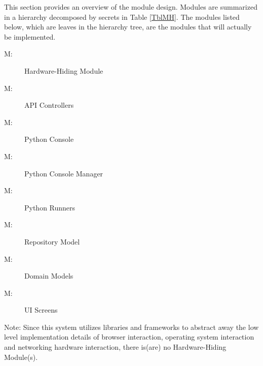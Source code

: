 \documentclass[12pt, titlepage]{article}
\newcounter{mnum}
\newcommand{\mthemnum}{M\themnum}
\begin{document}
This section provides an overview of the module design. Modules are summarized
in a hierarchy decomposed by secrets in Table \ref{TblMH}. The modules listed
below, which are leaves in the hierarchy tree, are the modules that will
actually be implemented.

\begin{description}
\item [ \mthemnum \label{mHH}:] Hardware-Hiding Module
\item [ \mthemnum \label{mHH}:] API Controllers
\item [ \mthemnum \label{mHH}:] Python Console
\item [ \mthemnum \label{mHH}:] Python Console Manager
\item [ \mthemnum \label{mHH}:] Python Runners
\item [ \mthemnum \label{mHH}:] Repository Model
\item [ \mthemnum \label{mHH}:] Domain Models
\item [ \mthemnum \label{mHH}:] UI Screens
\end{description}

Note: Since this system utilizes libraries and frameworks to abstract away the
low level implementation details of browser interaction, operating system
interaction and networking hardware interaction, there is(are) no
Hardware-Hiding Module(s).
\end{document}
